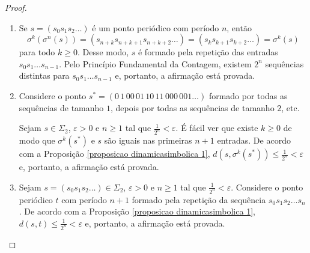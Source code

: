 \begin{proof}
\begin{enumerate}
\item Se $s = (s_0s_1s_2\dots)$ é um ponto periódico com período $n$, então
$$\sigma^k(\sigma^n(s)) = (s_{n+k}s_{n+k+1}s_{n+k+2}\dots) = (s_ks_{k+1}s_{k+2}\dots) = \sigma^k(s)$$
para todo $k \geq 0$. Desse modo, $s$ é formado pela repetição das entradas $s_0 s_1 \dots s_{n-1}$. Pelo Princípio Fundamental da Contagem, existem $2^n$ sequências distintas para  $s_0 s_1 \dots s_{n-1}$ e, portanto, a afirmação está provada.

\item Considere o ponto $s^* = (0 \, 1 \, 0 0 \, 0 1 \, 1 0 \, 1 1 \, 0 0 0 \, 0 0 1 \dots)$ formado por todas as sequências de tamanho $1$, depois por todas as sequências de tamanho $2$, etc. 

Sejam $s \in \Sigma_2$, $\varepsilon > 0$ e $n \geq 1$ tal que $\frac{1}{2^n} < \varepsilon$. É fácil ver que existe $k \geq 0$ de modo que $\sigma^k(s^*)$ e $s$ são iguais nas primeiras $n+1$ entradas. De acordo com a Proposição \ref{proposicao dinamicasimbolica 1}, $d(s, \sigma^k(s^*)) \leq \frac{1}{2^n} < \varepsilon$ e, portanto, a afirmação está provada.

\item Sejam $s = (s_0 s_1 s_2 \dots) \in \Sigma_2$, $\varepsilon > 0$ e $n \geq 1$ tal que $\frac{1}{2^n} < \varepsilon$. Considere o ponto periódico $t$ com período $n+1$ formado pela repetição da sequência $s_0 s_1 s_2 \dots s_n$. De acordo com a Proposição \ref{proposicao dinamicasimbolica 1}, $d(s, t) \leq \frac{1}{2^n} < \varepsilon$ e, portanto, a afirmação está provada.
\end{enumerate}
\end{proof}
